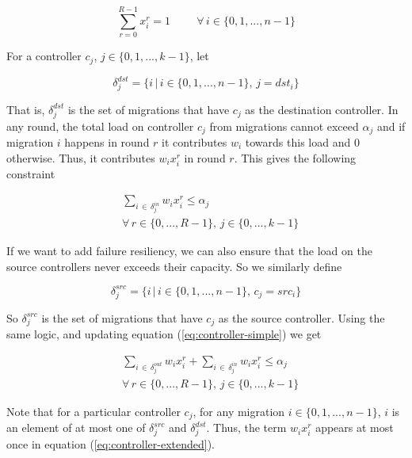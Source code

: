 \documentclass[conference]{IEEEtran}
\begin{document}
\begin{equation}\label{eq:single-migration}
    \sum_{r=0}^{R-1} x^{r}_{i} = 1 \hspace{1cm} \forall \, i \in \{0, 1, ..., n - 1\}
\end{equation}

\noindent For a controller $c_{j}$, $j \in \{0, 1, ..., k - 1\}$, let 

$$\delta^{dst}_{j} = \{i \, | \, i \in \{0, 1, ..., n-1\}, \, j = dst_{i}\}$$

That is, $\delta^{dst}_{j}$ is the set of migrations that have $c_{j}$ as the destination controller. In any round, the total load on controller $c_{j}$ from migrations cannot exceed $\alpha_{j}$ and if migration $i$ happens in round $r$ it contributes $w_{i}$ towards this load and 0 otherwise. Thus, it contributes $w_{i}x^{r}_{i}$ in round $r$. This gives the following constraint

\begin{equation}\label{eq:controller-simple}
\begin{split}
    &\sum_{i \, \in \, \delta^{in}_{j}} w_{i}x^{r}_{i} \leq \alpha_{j} \\ 
    &\forall \, r \in \{0, ..., R-1\}, \, j \in \{0, ..., k-1\}
\end{split}
\end{equation}

If we want to add failure resiliency, we can also ensure that the load on the source controllers never exceeds their capacity. So we similarly define

$$\delta^{src}_{j} = \{i \, | \, i \in \{0, 1, ..., n-1\}, \, c_{j} = src_{i}\}$$

So $\delta^{src}_{j}$ is the set of migrations that have $c_{j}$ as the source controller. Using the same logic, and updating equation (\ref{eq:controller-simple}) we get

\begin{equation}\label{eq:controller-extended}
\begin{split}
    &\sum_{i \, \in \, \delta^{out}_{j}} w_{i}x^{r}_{i} + \sum_{i \, \in \, \delta^{in}_{j}} w_{i}x^{r}_{i} \leq \alpha_{j} \\
    &\forall \, r \in \{0, ..., R-1\}, \, j \in \{0, ..., k-1\}
\end{split}
\end{equation}

Note that for a particular controller $c_{j}$, for any migration $i \in \{0, 1, ..., n-1\}$, $i$ is an element of at most one of $\delta^{src}_{j}$ and $\delta^{dst}_{j}$. Thus, the term $w_{i}x^{r}_{i}$ appears at most once in equation (\ref{eq:controller-extended}).
\end{document}
